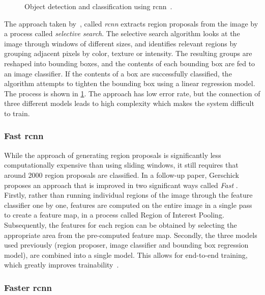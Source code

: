 \documentclass[\rootfolder/main.tex]{subfiles}
\begin{document}
\begin{figure}
    \caption[Object detection and classification using \acrshort{rcnn}.]{Object detection and classification using \acrshort{rcnn}~\cite{Girshick2013}.}
    \label{fig:r-cnn}
\end{figure}

The approach taken by~\cite{Girshick2013}, called \emph{\acrfull{rcnn}} extracts region proposals from the image by a process called \emph{selective search}.
The selective search algorithm looks at the image through windows of different sizes, and identifies relevant regions by grouping adjacent pixels by color, texture or intensity.
The resulting groups are reshaped into bounding boxes, and the contents of each bounding box are fed to an image classifier.
If the contents of a box are successfully classified, the algorithm attempts to tighten the bounding box using a linear regression model.
The process is shown in \cref{fig:r-cnn}.
The approach has low error rate, but the connection of three different models leads to high complexity which makes the system difficult to train.

\subsubsection{Fast \acrshort{rcnn}}

While the approach of generating region proposals is significantly less computationally expensive than using sliding windows, it still requires that around 2000 region proposals are classified.
In a follow-up paper, Gerschick proposes an approach that is improved in two significant ways called \emph{Fast }.
Firstly, rather than running individual regions of the image through the feature classifier one by one, features are computed on the entire image in a single pass to create a feature map, in a process called Region of Interest Pooling.
Subsequently, the features for each region can be obtained by selecting the appropriate area from the pre-computed feature map.
Secondly, the three models used previously (region proposer, image classifier and bounding box regression model), are combined into a single model.
This allows for end-to-end training, which greatly improves trainability~\cite{Girshick2015}.

\subsubsection{Faster \acrshort{rcnn}}
\end{document}
